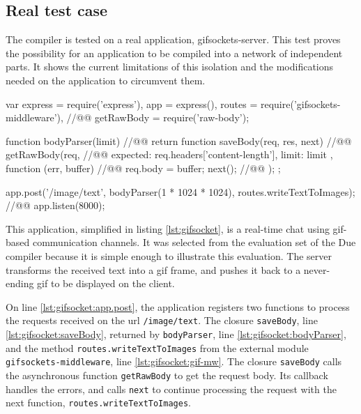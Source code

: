 \subsection{Real test case} \label{chapter5:flx:evaluation}

The compiler is tested on a real application, gifsockets-server.
This test proves the possibility for an application to be compiled into a network of independent parts.
It shows the current limitations of this isolation and the modifications needed on the application to circumvent them.

\begin{code}[js, caption={Simplified version of gifsockets-server},label={lst:gifsocket}]
var express = require('express'),
    app = express(),
    routes = require('gifsockets-middleware'), //@\label{lst:gifsocket:gif-mw}@
    getRawBody = require('raw-body');

function bodyParser(limit) { //@\label{lst:gifsocket:bodyParser}@
  return function saveBody(req, res, next) { //@\label{lst:gifsocket:saveBody}@
    getRawBody(req, { //@\label{lst:gifsocket:getRawBody}@
      expected: req.headers['content-length'],
      limit: limit
    }, function (err, buffer) { //@\label{lst:gifsocket:callback}@
      req.body = buffer;
      next(); //@\label{lst:gifsocket:next}@
    });
  };
}

app.post('/image/text', bodyParser(1 * 1024 * 1024), routes.writeTextToImages); //@\label{lst:gifsocket:app.post}@
app.listen(8000);
\end{code}

This application, simplified in listing \ref{lst:gifsocket}, is a real-time chat using gif-based communication channels.
It was selected from the evaluation set of the Due compiler because it is simple enough to illustrate this evaluation.
The server transforms the received text into a gif frame, and pushes it back to a never-ending gif to be displayed on the client.

On line \ref{lst:gifsocket:app.post}, the application registers two functions to process the requests received on the url \texttt{/image/text}.
The closure \texttt{saveBody}, line \ref{lst:gifsocket:saveBody}, returned by \texttt{bodyParser}, line \ref{lst:gifsocket:bodyParser}, and the method \texttt{routes.write\-Text\-To\-Images} from the external module \texttt{gifsockets-\-middleware}, line \ref{lst:gifsocket:gif-mw}.
The closure \texttt{saveBody} calls the asynchronous function \texttt{getRawBody} to get the request body.
Its callback handles the errors, and calls \texttt{next} to continue processing the request with the next function, \texttt{routes.write\-Text\-To\-Images}.

